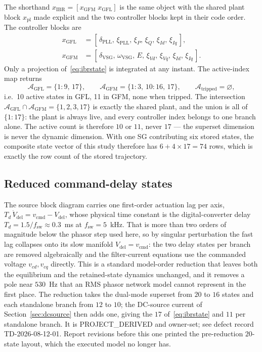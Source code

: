 \documentclass[12pt,a4paper]{article}
\theoremstyle{remark}
\begin{document}
The shorthand $x_{\mathrm{IBR}}=[x_{\mathrm{GFM}}\;x_{\mathrm{GFL}}]$ is the
same object with the shared plant block $x_{\mathrm{pl}}$ made explicit and the
two controller blocks kept in their code order. The controller blocks are
\begin{align}
  x_{\mathrm{GFL}}&=[\,\delta_{\mathrm{PLL}},\,\xi_{\mathrm{PLL}},\,\xi_P,\,\xi_Q,
      \,\xi_{Id},\,\xi_{Iq}\,],\\
  x_{\mathrm{GFM}}&=[\,\delta_{\mathrm{VSG}},\,\omega_{\mathrm{VSG}},\,E,
      \,\xi_{Vd},\,\xi_{Vq},\,\xi_{Id},\,\xi_{Iq}\,].
\end{align}
Only a projection of~\eqref{eq:ibrstate} is integrated at any instant. The
active-index map returns
\begin{equation}
  \mathcal{A}_{\mathrm{GFL}}=\{1{:}9,\,17\},\qquad
  \mathcal{A}_{\mathrm{GFM}}=\{1{:}3,\,10{:}16,\,17\},\qquad
  \mathcal{A}_{\mathrm{tripped}}=\varnothing,
  \label{eq:ibractive}
\end{equation}
i.e.\ 10 active states in GFL, 11 in GFM, none when tripped. The intersection
$\mathcal{A}_{\mathrm{GFL}}\cap\mathcal{A}_{\mathrm{GFM}}=\{1,2,3,17\}$ is
exactly the shared plant, and the union is all of $\{1{:}17\}$: the plant is
always live, and every controller index belongs to one branch alone. The active
count is therefore $10$ or $11$, never $17$ --- the superset dimension is never
the dynamic dimension. With
one SG contributing six stored states, the composite state vector of this study
therefore has $6+4\times17=74$ rows, which is exactly the row count of the stored
trajectory.

\subsection{Reduced command-delay states}\label{sec:ibr-reduction}
The source block diagram carries one first-order actuation lag per axis,
$T_d\,\dot V_{\mathrm{del}}=v_{\mathrm{cmd}}-V_{\mathrm{del}}$, whose physical
time constant is the digital-converter delay
$T_d=1.5/f_{\mathrm{sw}}\approx0.3$~ms at $f_{\mathrm{sw}}=5$~kHz. That is more
than two orders of magnitude below the phasor step used here, so by singular
perturbation the fast lag collapses onto its slow manifold
$V_{\mathrm{del}}=v_{\mathrm{cmd}}$: the two delay states per branch are removed
algebraically and the filter-current equations use the commanded voltage
$v_{cd},v_{cq}$ directly. This is a standard model-order reduction that leaves
both the equilibrium and the retained-state dynamics unchanged, and it removes a
pole near $530$~Hz that an RMS phasor network model cannot represent in the first
place. The reduction takes the dual-mode superset from $20$ to $16$ states and each
standalone branch from $12$ to $10$; the DC-source current of
Section~\ref{sec:dcsource} then adds one, giving the $17$
of~\eqref{eq:ibrstate} and $11$ per standalone branch. It is
\textsf{PROJECT\_DERIVED} and owner-set; see defect record
\textsf{TD-2026-08-12-01}. Report revisions before this one printed the
pre-reduction $20$-state layout, which the executed model no longer has.
\end{document}
